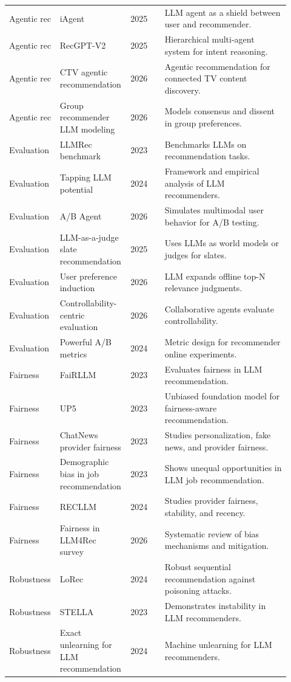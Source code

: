\documentclass[11pt]{article}
\begin{document}
\begin{longtable}{@{}p{0.13\linewidth}p{0.23\linewidth}p{0.12\linewidth}p{0.44\linewidth}@{}}
Agentic rec & iAgent & 2025 & LLM agent as a shield between user and recommender.\\
Agentic rec & RecGPT-V2 & 2025 & Hierarchical multi-agent system for intent reasoning.\\
Agentic rec & CTV agentic recommendation & 2026 & Agentic recommendation for connected TV content discovery.\\
Agentic rec & Group recommender LLM modeling & 2026 & Models consensus and dissent in group preferences.\\
Evaluation & LLMRec benchmark & 2023 & Benchmarks LLMs on recommendation tasks.\\
Evaluation & Tapping LLM potential & 2024 & Framework and empirical analysis of LLM recommenders.\\
Evaluation & A/B Agent & 2026 & Simulates multimodal user behavior for A/B testing.\\
Evaluation & LLM-as-a-judge slate recommendation & 2025 & Uses LLMs as world models or judges for slates.\\
Evaluation & User preference induction & 2026 & LLM expands offline top-N relevance judgments.\\
Evaluation & Controllability-centric evaluation & 2026 & Collaborative agents evaluate controllability.\\
Evaluation & Powerful A/B metrics & 2024 & Metric design for recommender online experiments.\\
Fairness & FaiRLLM & 2023 & Evaluates fairness in LLM recommendation.\\
Fairness & UP5 & 2023 & Unbiased foundation model for fairness-aware recommendation.\\
Fairness & ChatNews provider fairness & 2023 & Studies personalization, fake news, and provider fairness.\\
Fairness & Demographic bias in job recommendation & 2023 & Shows unequal opportunities in LLM job recommendation.\\
Fairness & RECLLM & 2024 & Studies provider fairness, stability, and recency.\\
Fairness & Fairness in LLM4Rec survey & 2026 & Systematic review of bias mechanisms and mitigation.\\
Robustness & LoRec & 2024 & Robust sequential recommendation against poisoning attacks.\\
Robustness & STELLA & 2023 & Demonstrates instability in LLM recommenders.\\
Robustness & Exact unlearning for LLM recommendation & 2024 & Machine unlearning for LLM recommenders.\\

\end{longtable}
\end{document}
